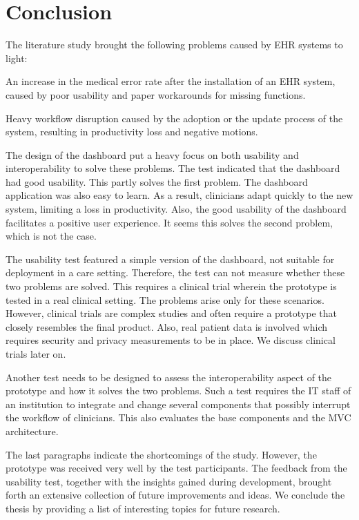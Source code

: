 \section{Conclusion}

The literature study brought the following problems caused by EHR systems to light:
\begin{myitemize}
    \item An increase in the medical error rate after the installation of an EHR system, caused by poor usability and paper workarounds for missing functions.
    \item Heavy workflow disruption caused by the adoption or the update process of the system, resulting in productivity loss and negative motions.
\end{myitemize}

\noindent The design of the dashboard put a heavy focus on both usability and interoperability to solve these problems. The test indicated that the dashboard had good usability. This partly solves the first problem. The dashboard application was also easy to learn. As a result, clinicians adapt quickly to the new system, limiting a loss in productivity. Also, the good usability of the dashboard facilitates a positive user experience. It seems this solves the second problem, which is not the case.

The usability test featured a simple version of the dashboard, not suitable for deployment in a care setting. Therefore, the test can not measure whether these two problems are solved. This requires a clinical trial wherein the prototype is tested in a real clinical setting. The problems arise only for these scenarios. However, clinical trials are complex studies and often require a prototype that closely resembles the final product. Also, real patient data is involved which requires security and privacy measurements to be in place. We discuss clinical trials later on.

Another test needs to be designed to assess the interoperability aspect of the prototype and how it solves the two problems. Such a test requires the IT staff of an institution to integrate and change several components that possibly interrupt the workflow of clinicians. This also evaluates the base components and the MVC architecture.

The last paragraphs indicate the shortcomings of the study. However, the prototype was received very well by the test participants. The feedback from the usability test, together with the insights gained during development, brought forth an extensive collection of future improvements and ideas. We conclude the thesis by providing a list of interesting topics for future research.

